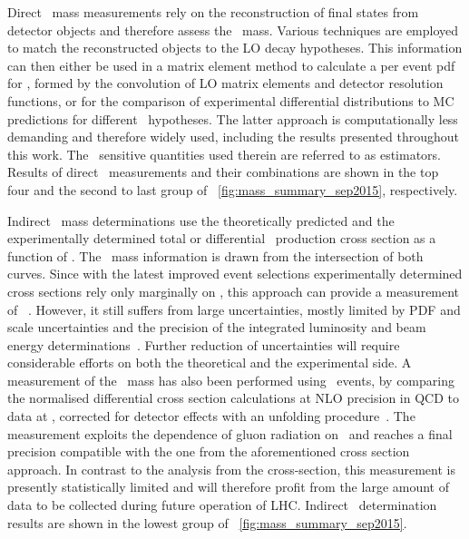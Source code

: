 Direct \tquark\ mass measurements rely on the reconstruction of final states from detector objects and therefore assess the \mtMC\ mass. Various techniques are employed to match the reconstructed objects to the \gls{LO} decay hypotheses. This information can then either be used in a matrix element method to calculate a per event \gls{pdf} for \mt, formed by the convolution of \gls{LO} matrix elements and detector resolution functions, or for the comparison of experimental differential distributions to \gls{MC} predictions for different \mt\ hypotheses. The latter approach is computationally less demanding and therefore widely used, including the results presented throughout this work. The \mt\ sensitive quantities used therein are referred to as estimators. Results of direct \mt\ measurements and their combinations are shown in the top four and the second to last group of \fig~\ref{fig:mass_summary_sep2015}, respectively.


Indirect \tquark\ mass determinations use the theoretically predicted and the experimentally determined total or differential \ttbar\ production cross section as a function of \mt. The \tquark\ mass information is drawn from the intersection of both curves. Since  with the latest improved event selections experimentally determined cross sections rely only marginally on \mtMC, this approach can provide a measurement of \mtpole~\cite{Nisius:2012gm}.
%
However, it still suffers from large uncertainties, mostly limited by \gls{PDF} and scale uncertainties and the precision of the integrated luminosity and beam energy determinations~\cite{ATLASCollaboration2014a,CMS-PAS-TOP-13-004}. Further reduction of uncertainties will require considerable efforts on both the theoretical and the experimental side.
%
A measurement of the \mtpole\ mass has also been performed using \ttbarj\ events, by comparing the normalised differential cross section calculations at \gls{NLO} precision in \gls{QCD} to data at \genlevel, corrected for detector effects with an unfolding procedure~\cite{ATLAS:2014zza}. The measurement exploits the dependence of gluon radiation on \mt\ and reaches a final precision compatible with the one from the aforementioned cross section approach. In contrast to the analysis from the cross-section, this measurement is presently statistically limited and will therefore profit from the large amount of data to be collected during future operation of \gls{LHC}.
%
%
Indirect \mt\ determination results are shown in the lowest group of \fig~\ref{fig:mass_summary_sep2015}.

